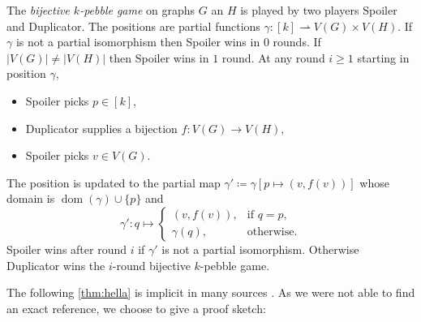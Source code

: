 \documentclass[10pt,a4paper]{article}
\DeclareMathOperator{\dom}{dom}
\begin{document}
The \emph{bijective $k$-pebble game} on graphs $G$ an $H$ is played by two players Spoiler and Duplicator. The positions are partial functions $\gamma \colon [k] \rightharpoonup V(G) \times V(H)$.
If $\gamma$ is not a partial isomorphism then Spoiler wins in $0$ rounds.
If $|V(G)| \neq |V(H)|$ then Spoiler wins in $1$ round.
At any round $i \geq 1$ starting in position $\gamma$,
\begin{itemize}
	\item Spoiler picks $p \in [k]$,
	\item Duplicator supplies a bijection $f \colon V(G) \to V(H)$,
	\item Spoiler picks $v \in V(G)$.
\end{itemize}
The position is updated to the partial map $\gamma' \coloneqq \gamma[p \mapsto (v, f(v))]$ whose domain is $\dom(\gamma) \cup \{p\}$ and
\[
	\gamma' \colon q \mapsto \begin{cases}
		(v, f(v)), & \text{if } q = p,\\
		\gamma(q), & \text{otherwise}.
	\end{cases}
\]
Spoiler wins after round $i$ if $\gamma'$ is not a partial isomorphism. Otherwise Duplicator wins the $i$-round bijective $k$-pebble game.

The following \cref{thm:hella} is implicit in many sources \cite{cai_optimal_1992,hella_logical_1996}. As we were not able to find an exact reference, we choose to give a proof sketch:
\end{document}
